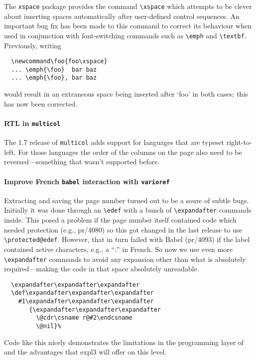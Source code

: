 \documentclass{ltnews}
\begin{document}
The \texttt{xspace} package provides the command \verb|\xspace|
which attempts to be clever about inserting spaces automatically
after user-defined control sequences.
An important bug fix has been made to this command to correct its
behaviour when used in conjunction with font-switching commands
such as \verb|\emph| and \verb|\textbf|.
Previously, writing
\begin{verbatim}
  \newcommand\foo{foo\xspace}
  ... \emph{\foo}  bar baz
  ... \emph{\foo}, bar baz
\end{verbatim}
would result in an extraneous space being inserted after `foo' in
both cases; this has now been corrected.


\paragraph{RTL in \texttt{multicol}}

  The 1.7 release of \texttt{multicol} adds support for languages that are typeset
  right-to-left. For those languages the order of the columns on the page
  also need to be reversed---something that wasn't supported before.


\paragraph{Improve French \texttt{babel} interaction with \texttt{varioref}}

 Extracting and saving the page number turned out to be a soure of subtle
 bugs. Initially it was done through an \verb"\edef" with a bunch of
\verb"\expandafter" commands inside. This posed a problem if the page number
 itself contained code which needed protection (e.g., pr/4080) so this got
 changed in the last release to use \verb"\protected@edef". However, that in turn failed with Babel
(pr/4093)   if the label contained active characters, e.g., a ``:'' in French. So now
we use even more \verb"\expandafter" commands to avoid any expansion other
 than what is absolutely  required---making the code in that space absolutely unreadable.
\begin{verbatim}
  \expandafter\expandafter\expandafter
  \def\expandafter\expandafter\expandafter
    #1\expandafter\expandafter\expandafter
       {\expandafter\expandafter\expandafter
         \@cdr\csname r@#2\endcsname
         \@nil}%
\end{verbatim}
Code like this nicely demonstrates the limitations in the programming layer of \LaTeXe{} and the advantages that  \textsf{expl3} will offer on this level.
\end{document}
